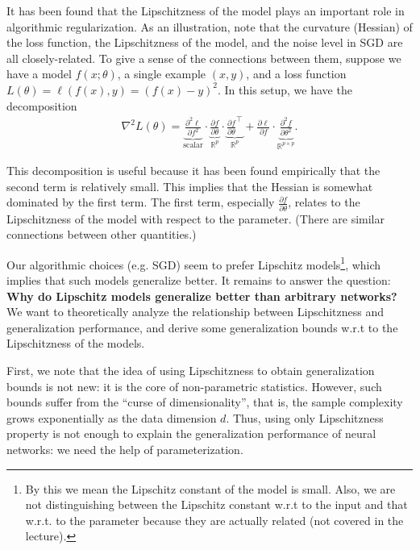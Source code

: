 It has been found that the Lipschitzness of the model plays an important role in algorithmic regularization. As an illustration, note that the curvature (Hessian) of the loss function, the Lipschitzness of the model, and the noise level in SGD are all closely-related. To give a sense of the connections between them, suppose we have a model $f(x; \theta)$, a single example $(x, y)$, and a loss function $L(\theta) = \ell (f(x), y) = (f(x) - y)^2$. In this setup, we have the decomposition
\begin{align}
\nabla^2 L(\theta) = \underbrace{{\frac{\partial^2 \ell}{\partial f^2}}}_{\text{scalar}} \cdot \underbrace{\frac{\partial f}{\partial \theta}}_{\mathbb{R}^p} \cdot \underbrace{\frac{\partial f}{\partial \theta}^\top}_{\mathbb{R}^p} + \frac{\partial \ell}{\partial f} \cdot  \underbrace{\frac{\partial^2 f}{\partial \theta^2}}_{\mathbb{R}^{p\times p}}.
\end{align}

This decomposition is useful because it has been found empirically that the second term is relatively small. This implies that the Hessian is somewhat dominated by the first term. The first term, especially $\frac{\partial  f}{\partial \theta}$, relates to the Lipschitzness of the model with respect to the parameter. (There are similar connections between other quantities.)

Our algorithmic choices (e.g. SGD) seem to prefer Lipschitz models\footnote{By this we mean the Lipschitz constant of the model is small. Also, we are not distinguishing between the Lipschitz constant w.r.t to the input and that w.r.t. to the parameter because they are actually related (not covered in the lecture).}, which implies that such models generalize better. It remains to answer the question: \textbf{Why do Lipschitz models generalize better than arbitrary networks?} We want to theoretically analyze the relationship between Lipschitzness and generalization performance, and derive some generalization bounds w.r.t to the Lipschitzness of the models.

First, we note that the idea of using Lipschitzness to obtain generalization bounds is not new: it is the core of non-parametric statistics. However, such bounds suffer from the ``curse of dimensionality'', that is, the sample complexity grows exponentially as the data dimension $d$. Thus, using only Lipschitzness property is not enough to explain the generalization performance of neural networks: we need the help of parameterization. 

